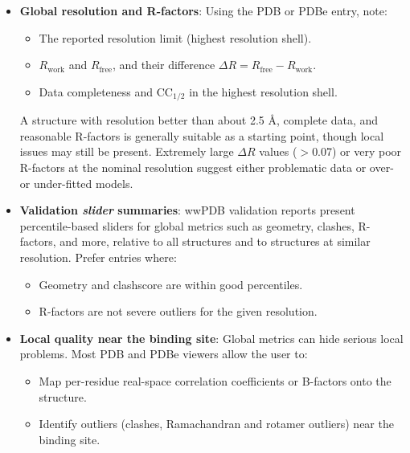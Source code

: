 \documentclass[12pt]{article}
\begin{document}
\begin{itemize}
 \item \textbf{Global resolution and R-factors}: Using the PDB or PDBe entry, note:

\begin{itemize}
  \item The reported resolution limit (highest resolution shell).
  \item $R_\text{work}$ and $R_\text{free}$, and their difference $\Delta R = R_\text{free} - R_\text{work}$.\cite{CH4_Wang2015_structure_quality,CH4_karplus2012linking}
  \item Data completeness and $\textrm{CC}_{1/2}$ in the highest resolution shell\cite{CH4_Evans2013_data_quality,CH4_Read2011_CC12}.
\end{itemize}

A structure with resolution better than about 2.5 \r{A}, complete data, and reasonable R-factors is generally suitable as a starting point, though local issues may still be present\cite{CH4_Wang2015_structure_quality,CH4_shao2017multivariate}. Extremely large $\Delta R$ values ($>$0.07) or very poor R-factors at the nominal resolution suggest either problematic data or over- or under-fitted models.

 \item \textbf{Validation \emph{slider} summaries}: wwPDB validation reports present percentile-based sliders for global metrics such as geometry, clashes, R-factors, and more, relative to all structures and to structures at similar resolution.\cite{CH4_karplus2012linking,CH4_shao2017multivariate,CH4_young2018worldwide} Prefer entries where:

\begin{itemize}
  \item Geometry and clashscore are within good percentiles.
  \item R-factors are not severe outliers for the given resolution.
\end{itemize}

 \item \textbf{Local quality near the binding site}: Global metrics can hide serious local problems\cite{CH4_chakraborti2021all,CH4_shao2017multivariate}. Most PDB and PDBe viewers allow the user to:
\begin{itemize}
  \item Map per-residue real-space correlation coefficients or B-factors onto the structure.
  \item Identify outliers (clashes, Ramachandran and rotamer outliers) near the binding site.
\end{itemize}


\end{itemize}
\end{document}
